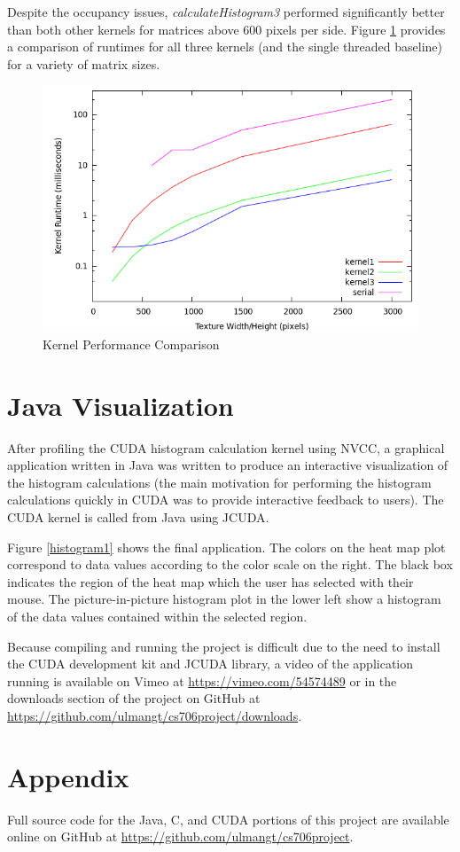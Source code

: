 \documentclass{article}
\begin{document}
Despite the occupancy issues, \emph{calculateHistogram3} performed significantly better than both other kernels for matrices above 600 pixels per side. Figure \ref{comparison1} provides a comparison of runtimes for all three kernels (and the single threaded baseline) for a variety of matrix sizes.

\begin{figure}
\centering
\includegraphics[width=1.0\textwidth]{screenshots/performance.png}
\caption{Kernel Performance Comparison}
\label{comparison1}
\end{figure}

\section{Java Visualization}\label{visualization}

After profiling the CUDA histogram calculation kernel using NVCC, a graphical application written in Java was written to produce an interactive visualization of the histogram calculations (the main motivation for performing the histogram calculations quickly in CUDA was to provide interactive feedback to users). The CUDA kernel is called from Java using JCUDA\cite{jcuda}.

Figure \ref{histogram1} shows the final application. The colors on the heat map plot correspond to data values according to the color scale on the right. The black box indicates the region of the heat map which the user has selected with their mouse. The picture-in-picture histogram plot in the lower left show a histogram of the data values contained within the selected region.

Because compiling and running the project is difficult due to the need to install the CUDA development kit and JCUDA library, a video of the application running is available on Vimeo at \url{https://vimeo.com/54574489} or in the downloads section of the project on GitHub at \url{https://github.com/ulmangt/cs706project/downloads}.

\section{Appendix}\label{appendix}

Full source code for the Java, C, and CUDA portions of this project are available online on GitHub at \url{https://github.com/ulmangt/cs706project}.



\end{document}

